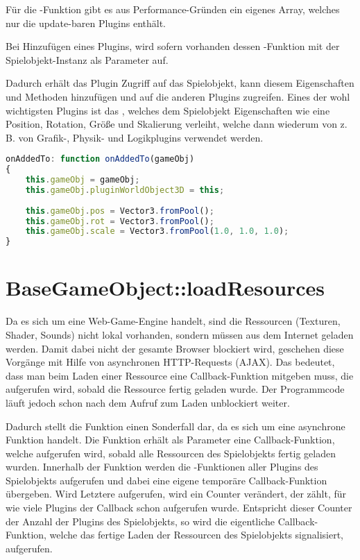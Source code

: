 Für die -Funktion gibt es aus Performance-Gründen ein eigenes Array, welches nur die update-baren Plugins enthält.

Bei Hinzufügen eines Plugins, wird sofern vorhanden dessen -Funktion mit der Spielobjekt-Instanz als Parameter auf.

Dadurch erhält das Plugin Zugriff auf das Spielobjekt, kann diesem Eigenschaften und Methoden hinzufügen und auf die anderen Plugins zugreifen. Eines der wohl wichtigsten Plugins ist das , welches dem Spielobjekt Eigenschaften wie eine Position, Rotation, Größe und Skalierung verleiht, welche dann wiederum von z. B. von Grafik-, Physik- und Logikplugins verwendet werden.

\begin{lstlisting}[language=JavaScript, caption=\textprog{onAddedTo}-Methode von \textprog{Plugin\_WorldObject3D}]
onAddedTo: function onAddedTo(gameObj)
{
	this.gameObj = gameObj;
	this.gameObj.pluginWorldObject3D = this;
	
	this.gameObj.pos = Vector3.fromPool();
	this.gameObj.rot = Vector3.fromPool();
	this.gameObj.scale = Vector3.fromPool(1.0, 1.0, 1.0);
}
\end{lstlisting}

\section{BaseGameObject::loadResources}

Da es sich um eine Web-Game-Engine handelt, sind die Ressourcen (Texturen, Shader, Sounds) nicht lokal vorhanden, sondern müssen aus dem Internet geladen werden. Damit dabei nicht der gesamte Browser blockiert wird, geschehen diese Vorgänge mit Hilfe von asynchronen HTTP-Requests (AJAX). Das bedeutet, dass man beim Laden einer Ressource eine Callback-Funktion mitgeben muss, die aufgerufen wird, sobald die Ressource fertig geladen wurde. Der Programmcode läuft jedoch schon nach dem Aufruf zum Laden unblockiert weiter.

Dadurch stellt die Funktion  einen Sonderfall dar, da es sich um eine asynchrone Funktion handelt. Die Funktion erhält als Parameter eine Callback-Funktion, welche aufgerufen wird, sobald alle Ressourcen des Spielobjekts fertig geladen wurden. Innerhalb der Funktion werden die -Funktionen aller Plugins des Spielobjekts aufgerufen und dabei eine eigene temporäre Callback-Funktion übergeben. Wird Letztere aufgerufen, wird ein Counter verändert, der zählt, für wie viele Plugins der Callback schon aufgerufen wurde. Entspricht dieser Counter der Anzahl der Plugins des Spielobjekts, so wird die eigentliche Callback-Funktion, welche das fertige Laden der Ressourcen des Spielobjekts signalisiert, aufgerufen.

